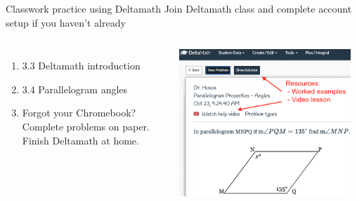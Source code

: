 \begin{frame}{Classwork practice using Deltamath}
  {Join Deltamath class and complete account setup if you haven't already}
  \begin{columns}
    \begin{enumerate}
      \item 3.3 Deltamath introduction
      \item 3.4 Parallelogram angles
      \item Forgot your Chromebook? Complete problems on paper. Finish Deltamath at home.
    \end{enumerate}
      \includegraphics[width=0.95\textwidth]{../graphics/03-4deltamath-parallelograms.png}
  \end{columns}
\end{frame}

